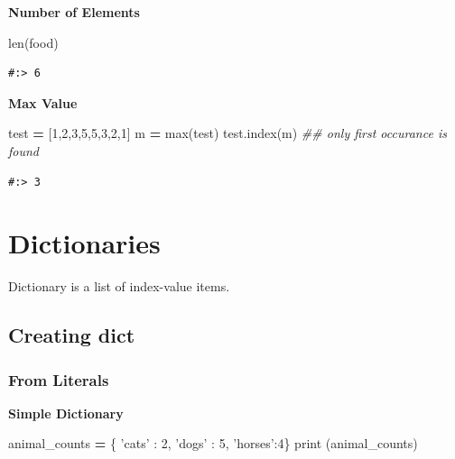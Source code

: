 \documentclass[
]{book}
\newenvironment{Shaded}{\begin{snugshade}}{\end{snugshade}}
\newcommand{\BuiltInTok}[1]{#1}
\newcommand{\CommentTok}[1]{\textcolor[rgb]{0.37,0.37,0.37}{\textit{#1}}}
\newcommand{\DecValTok}[1]{\textcolor[rgb]{0.06,0.06,0.06}{#1}}
\newcommand{\NormalTok}[1]{#1}
\newcommand{\OperatorTok}[1]{\textcolor[rgb]{0.43,0.43,0.43}{\textbf{#1}}}
\newcommand{\StringTok}[1]{\textcolor[rgb]{0.5,0.5,0.5}{#1}}
\begin{document}
\textbf{Number of Elements}

\begin{Shaded}
\begin{Highlighting}[]
\BuiltInTok{len}\NormalTok{(food)}
\end{Highlighting}
\end{Shaded}

\begin{verbatim}
#:> 6
\end{verbatim}

\textbf{Max Value}

\begin{Shaded}
\begin{Highlighting}[]
\NormalTok{test }\OperatorTok{=}\NormalTok{ [}\DecValTok{1}\NormalTok{,}\DecValTok{2}\NormalTok{,}\DecValTok{3}\NormalTok{,}\DecValTok{5}\NormalTok{,}\DecValTok{5}\NormalTok{,}\DecValTok{3}\NormalTok{,}\DecValTok{2}\NormalTok{,}\DecValTok{1}\NormalTok{]}
\NormalTok{m }\OperatorTok{=} \BuiltInTok{max}\NormalTok{(test)}
\NormalTok{test.index(m)  }\CommentTok{## only first occurance is found}
\end{Highlighting}
\end{Shaded}

\begin{verbatim}
#:> 3
\end{verbatim}

\hypertarget{dictionaries}{%
\section{Dictionaries}\label{dictionaries}}

Dictionary is a list of index-value items.

\hypertarget{creating-dict}{%
\subsection{Creating dict}\label{creating-dict}}

\hypertarget{from-literals}{%
\subsubsection{From Literals}\label{from-literals}}

\textbf{Simple Dictionary}

\begin{Shaded}
\begin{Highlighting}[]
\NormalTok{animal_counts }\OperatorTok{=}\NormalTok{ \{ }\StringTok{'cats'}\NormalTok{ : }\DecValTok{2}\NormalTok{, }\StringTok{'dogs'}\NormalTok{ : }\DecValTok{5}\NormalTok{, }\StringTok{'horses'}\NormalTok{:}\DecValTok{4}\NormalTok{\}}
\BuiltInTok{print}\NormalTok{ (animal_counts)}
\end{Highlighting}
\end{Shaded}
\end{document}
